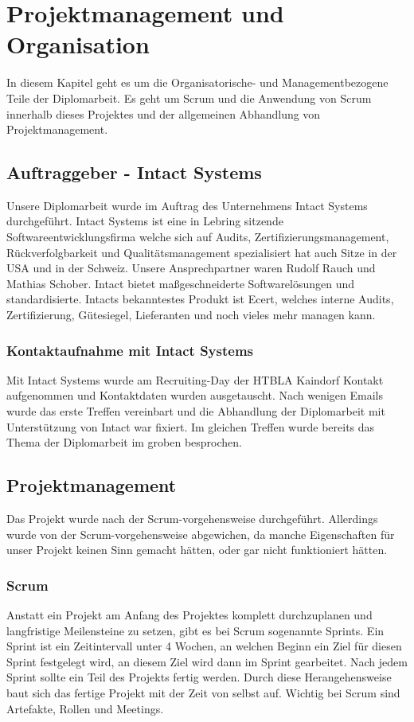 
\renewcommand{\theauthor}{Matthias Franz}

\chapter{Projektmanagement und Organisation}
In diesem Kapitel geht es um die Organisatorische- und Managementbezogene Teile der Diplomarbeit. Es geht um Scrum und die Anwendung von Scrum innerhalb dieses Projektes und der allgemeinen Abhandlung von Projektmanagement.

\label{sec:ProjUOrg}

\section{Auftraggeber - Intact Systems}
\label{sec:Auftraggeber}
Unsere Diplomarbeit wurde im Auftrag des Unternehmens Intact Systems durchgeführt. Intact Systems ist eine in Lebring sitzende Softwareentwicklungsfirma welche sich auf Audits, Zertifizierungsmanagement, Rückverfolgbarkeit und Qualitätsmanagement spezialisiert hat auch Sitze in der USA und in der Schweiz. Unsere Ansprechpartner waren Rudolf Rauch und Mathias Schober. Intact bietet maßgeschneiderte Softwarelösungen und standardisierte. Intacts bekanntestes Produkt ist Ecert, welches interne Audits, Zertifizierung, Gütesiegel, Lieferanten und noch vieles mehr managen kann.
	\subsection*{Kontaktaufnahme mit Intact Systems}
	Mit Intact Systems wurde am Recruiting-Day der HTBLA Kaindorf Kontakt aufgenommen und Kontaktdaten wurden ausgetauscht. Nach wenigen Emails wurde das erste Treffen vereinbart und die Abhandlung der Diplomarbeit mit Unterstützung von Intact war fixiert. Im gleichen Treffen wurde bereits das Thema der Diplomarbeit im groben besprochen.  
	
\section{Projektmanagement}
\label{sec:Projektmanagement}
Das Projekt wurde nach der Scrum-vorgehensweise durchgeführt. Allerdings wurde von der Scrum-vorgehensweise abgewichen, da manche Eigenschaften für unser Projekt keinen Sinn gemacht hätten, oder gar nicht funktioniert hätten.
	\subsection{Scrum}
	Anstatt ein Projekt am Anfang des Projektes komplett durchzuplanen und langfristige Meilensteine zu setzen, gibt es bei Scrum sogenannte Sprints. Ein Sprint ist ein Zeitintervall unter 4 Wochen, an welchen Beginn ein Ziel für diesen Sprint festgelegt wird, an diesem Ziel wird dann im Sprint gearbeitet. Nach jedem Sprint sollte ein Teil des Projekts fertig werden. Durch diese Herangehensweise baut sich das fertige Projekt mit der Zeit von selbst auf. Wichtig bei Scrum sind Artefakte, Rollen und Meetings.
